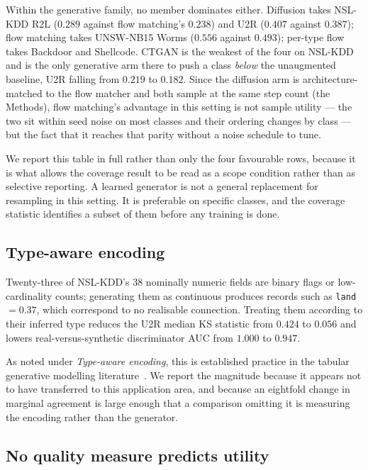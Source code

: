 \documentclass[11pt]{article}
\begin{document}
Within the generative family, no member dominates either. Diffusion takes NSL-KDD
R2L ($0.289$ against flow matching's $0.238$) and U2R ($0.407$ against $0.387$);
flow matching takes UNSW-NB15 Worms ($0.556$ against $0.493$); per-type flow takes
Backdoor and Shellcode. CTGAN is the weakest of the four on NSL-KDD and is the only
generative arm there to push a class \emph{below} the unaugmented baseline, U2R
falling from $0.219$ to $0.182$. Since the diffusion arm is architecture-matched to
the flow matcher and both sample at the same step count
(the Methods), flow matching's advantage in this setting is not
sample utility --- the two sit within seed noise on most classes and their ordering
changes by class --- but the fact that it reaches that parity without a noise
schedule to tune.

We report this table in full rather than only the four favourable rows, because it is what allows the coverage result to be read as a scope condition rather than
as selective reporting. A learned generator is not a general replacement for
resampling in this setting. It is preferable on specific classes, and the coverage
statistic identifies a subset of them before any training is done.

\subsection*{Type-aware encoding}

Twenty-three of NSL-KDD's 38 nominally numeric fields are binary flags or
low-cardinality counts; generating them as continuous produces records such as
\texttt{land}~$=0.37$, which correspond to no realisable connection. Treating them
according to their inferred type reduces the U2R median KS statistic from $0.424$ to
$0.056$ and lowers real-versus-synthetic discriminator AUC from $1.000$ to $0.947$.

As noted under \emph{Type-aware encoding}, this is established practice in the
tabular generative modelling literature~\cite{kotelnikov2023tabddpm,xu2019modeling}.
We report the magnitude because it appears not to have transferred to this
application area, and because an eightfold change in marginal agreement is large
enough that a comparison omitting it is measuring the encoding rather than the
generator.

\subsection*{No quality measure predicts utility}
\end{document}
